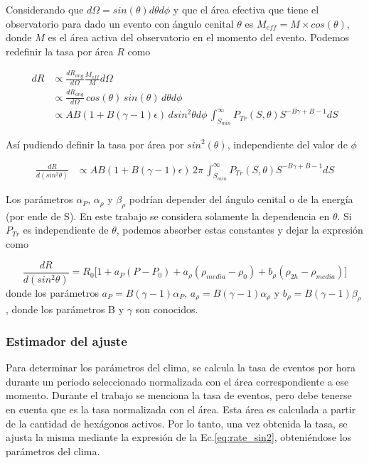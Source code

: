 Considerando que $d\Omega= sin(\theta)d\theta d\phi$ y que el área efectiva  que tiene el observatorio para dado un evento con ángulo cenital $\theta$ es $M_{eff}=M\times cos(\theta)$, donde $M$ es el área activa del observatorio en el momento del evento. Podemos redefinir la tasa por área $R$ como

\begin{align*}
	dR 	&\propto \frac{dR_{ang}}{d\Omega} \frac{M_{eff}}{M} d\Omega \\
		&\propto \frac{dR_{ang}}{d\Omega}\, cos(\theta)\, sin(\theta)\,d\theta d\phi\\
		&\propto  AB(1+B(\gamma - 1)\epsilon)\,dsin^2\theta d\phi\,\int_{S_{min}}^{\infty} P_{Tr}(S,\theta) S^{-B\gamma +B -1} dS
\end{align*}

Así pudiendo definir la tasa por área por $sin^2(\theta)$, independiente del valor de $\phi$

\begin{align*}
	\frac{dR}{d(sin^2\theta)} &\propto AB(1+B(\gamma-1)\epsilon)\, 2\pi \,\int_{S_{min}}^{\infty} P_{Tr}(S,\theta) S^{-B\gamma +B -1} dS
\end{align*}

Los parámetros $\alpha_P$, $\alpha_{\rho}$ y $\beta_{\rho}$ podrían depender del ángulo cenital o de la energía (por ende de S). En este trabajo se considera solamente la dependencia en $\theta$. Si $P_{Tr}$ es independiente de $\theta$, podemos absorber estas constantes y dejar la expresión como

\begin{equation}
	\frac{dR}{d(sin^2\theta)} = R_0\bigg[1+a_P(P-P_0) +a_{\rho}(\rho_{media}-\rho_0) + b_{\rho}(\rho_{2h}-\rho_{media})\bigg] 
	\label{eq:rate_sin2}
\end{equation}
donde los parámetros $a_P=B(\gamma-1)\alpha_{P}$, $a_{\rho}=B(\gamma-1)\alpha_{\rho}$ y $b_{\rho}=B(\gamma-1)\beta_{\rho}$, donde los parámetros B y $\gamma$ son conocidos.

\subsubsection{Estimador del ajuste}

Para determinar los parámetros del clima, se calcula la tasa de eventos por hora durante un periodo seleccionado normalizada con el área correspondiente a ese momento. Durante el trabajo se menciona la tasa de eventos, pero debe tenerse en cuenta que es la tasa normalizada con el área. Esta área es calculada a partir de la cantidad de hexágonos activos. Por lo tanto, una vez obtenida la tasa, se ajusta la misma mediante la expresión de la Ec.\ref{eq:rate_sin2}, obteniéndose los parámetros del clima.

